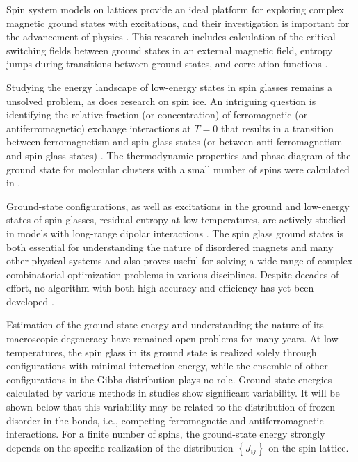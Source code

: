 \documentclass[preprint,12pt]{elsarticle}
\begin{document}
Spin system models on lattices provide an ideal platform for exploring complex magnetic ground states with excitations, and their investigation is important for the advancement of physics \cite{lacroix2011introduction}. This research includes calculation of the critical switching fields between ground states in an external magnetic field, entropy jumps during transitions between ground states, and correlation functions \cite{ramirez2004effect, rosas2004random, andriushchenko2019large}.  

Studying the energy landscape of low-energy states in spin glasses \cite{biswas2023energy} remains a unsolved problem, as does research on spin ice. An intriguing question is identifying the relative fraction (or concentration) of ferromagnetic (or antiferromagnetic) exchange interactions at $T=0$ that results in a transition between ferromagnetism and spin glass states (or between anti-ferromagnetism and spin glass states) \cite{gruzberg2001random, honecker2001universality, picco2006strong, tsomokos2011interplay, zimmer2022role}. The thermodynamic properties and phase diagram of the ground state for molecular clusters with a small number of spins were calculated in \cite{dias2023ground}.

Ground-state configurations, as well as excitations in the ground and low-energy states of spin glasses, residual entropy at low temperatures, are actively studied in models with long-range dipolar interactions \cite{makarova2021low, singh2024micromagnetic}. The spin glass ground states is both essential for understanding the nature of disordered magnets and many other physical systems and also proves useful for solving a wide range of complex combinatorial optimization problems in various disciplines. Despite decades of effort, no algorithm with both high accuracy and efficiency has yet been developed \cite{fan2023searching}.  

Estimation of the ground-state energy and understanding the nature of its macroscopic degeneracy have remained open problems for many years. At low temperatures, the spin glass in its ground state is realized solely through configurations with minimal interaction energy, while the ensemble of other configurations in the Gibbs distribution plays no role. Ground-state energies calculated by various methods in studies \cite{thouless1977solution, sherrington1975solvable, tanaka1980analytic, klein1976comparison, kirkpatrick1978infinite, karandashev2019global, palmer1999ground, campbell2004energy, roma2009ground} show significant variability. It will be shown below that this variability may be related to the distribution of frozen disorder in the bonds, i.e., competing ferromagnetic and antiferromagnetic interactions. For a finite number of spins, the ground-state energy strongly depends on the specific realization of the distribution $\left\lbrace J_{ij} \right\rbrace$ on the spin lattice.  
\end{document}
